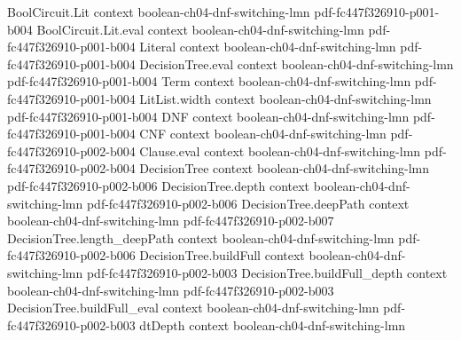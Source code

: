 \begin{theorem}
\label{LMN.subsequent_step_reduction}
\leanok
{}
\proofstep
  {BoolCircuit.Lit}
  {context}
  {boolean-ch04-dnf-switching-lmn}
  {pdf-fc447f326910-p001-b004}
\proofstep
  {BoolCircuit.Lit.eval}
  {context}
  {boolean-ch04-dnf-switching-lmn}
  {pdf-fc447f326910-p001-b004}
\proofstep
  {Literal}
  {context}
  {boolean-ch04-dnf-switching-lmn}
  {pdf-fc447f326910-p001-b004}
\proofstep
  {DecisionTree.eval}
  {context}
  {boolean-ch04-dnf-switching-lmn}
  {pdf-fc447f326910-p001-b004}
\proofstep
  {Term}
  {context}
  {boolean-ch04-dnf-switching-lmn}
  {pdf-fc447f326910-p001-b004}
\proofstep
  {LitList.width}
  {context}
  {boolean-ch04-dnf-switching-lmn}
  {pdf-fc447f326910-p001-b004}
\proofstep
  {DNF}
  {context}
  {boolean-ch04-dnf-switching-lmn}
  {pdf-fc447f326910-p001-b004}
\proofstep
  {CNF}
  {context}
  {boolean-ch04-dnf-switching-lmn}
  {pdf-fc447f326910-p002-b004}
\proofstep
  {Clause.eval}
  {context}
  {boolean-ch04-dnf-switching-lmn}
  {pdf-fc447f326910-p002-b004}
\proofstep
  {DecisionTree}
  {context}
  {boolean-ch04-dnf-switching-lmn}
  {pdf-fc447f326910-p002-b006}
\proofstep
  {DecisionTree.depth}
  {context}
  {boolean-ch04-dnf-switching-lmn}
  {pdf-fc447f326910-p002-b006}
\proofstep
  {DecisionTree.deepPath}
  {context}
  {boolean-ch04-dnf-switching-lmn}
  {pdf-fc447f326910-p002-b007}
\proofstep
  {DecisionTree.length_deepPath}
  {context}
  {boolean-ch04-dnf-switching-lmn}
  {pdf-fc447f326910-p002-b006}
\proofstep
  {DecisionTree.buildFull}
  {context}
  {boolean-ch04-dnf-switching-lmn}
  {pdf-fc447f326910-p002-b003}
\proofstep
  {DecisionTree.buildFull_depth}
  {context}
  {boolean-ch04-dnf-switching-lmn}
  {pdf-fc447f326910-p002-b003}
\proofstep
  {DecisionTree.buildFull_eval}
  {context}
  {boolean-ch04-dnf-switching-lmn}
  {pdf-fc447f326910-p002-b003}
\proofstep
  {dtDepth}
  {context}
  {boolean-ch04-dnf-switching-lmn}

\end{theorem}
